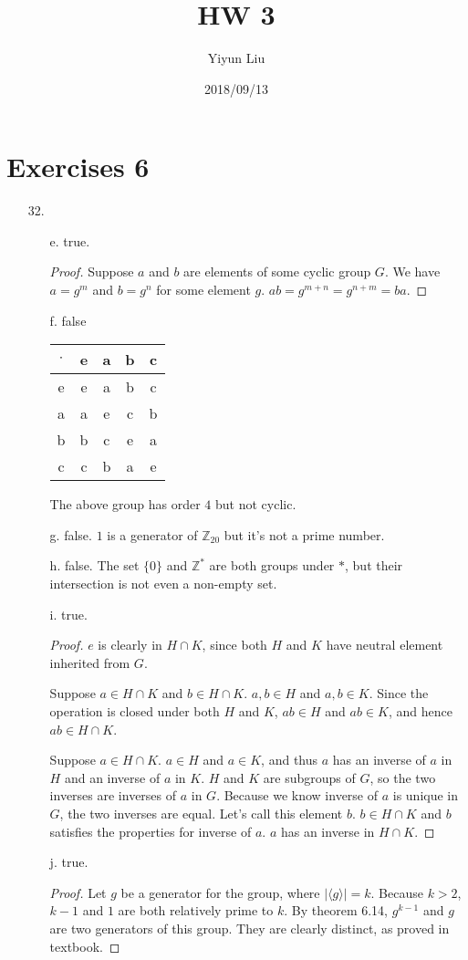 \documentclass{article}
\title{HW 3}
\date{2018/09/13}
\author{Yiyun Liu}
\begin{document}
\maketitle
\lstset{basicstyle=\ttfamily}

\section*{Exercises 6}
\begin{itemize}
\item [32.]
  \begin{itemize}
  \item [e.] true.
    \begin{proof}
      Suppose $a$ and $b$ are elements of some cyclic group $G$. We have $a=g^m$ and $b=g^n$ for some element $g$. $ab = g^{m+n} = g^{n+m}=ba$.
    \end{proof}
  \item [f.] false\\
    \begin{tabular}{c | c c c c }
      $\cdot$&e&a&b&c\\
      \hline
      e&e&a&b&c\\
      a&a&e&c&b\\
      b&b&c&e&a\\
      c&c&b&a&e
    \end{tabular}
    The above group has order $4$ but not cyclic. 
  \item [g.] false.
    $1$ is a generator of $\mathbb{Z}_{20}$ but it's not a prime number.
  \item [h.] false. The set $\{0\}$ and $\mathbb{Z}^*$ are both groups under $*$, but their intersection is not even a non-empty set.
  \item [i.] true.
    \begin{proof}
      $e$ is clearly in $H \cap K$, since both $H$ and $K$ have neutral element inherited from $G$.

      Suppose $a \in H \cap K$ and $b \in H \cap K$. $a,b\in H$ and $a,b \in K$. Since the operation is closed under both $H$ and $K$, $ab \in H$ and $ab \in K$, and hence $ab \in H \cap K$.

      Suppose $a \in H \cap K$. $a \in H$ and $a \in K$, and thus $a$ has an inverse of $a$ in $H$ and an inverse of $a$ in $K$. $H$ and $K$ are subgroups of $G$, so the two inverses are inverses of $a$ in $G$. Because we know inverse of $a$ is unique in $G$, the two inverses are equal. Let's call this element $b$. $b \in H \cap K$ and $b$ satisfies the properties for inverse of $a$. $a$ has an inverse in $H \cap K$.
    \end{proof}
  \item [j.] true.
    \begin{proof}
      Let $g$ be a generator for the group, where $|\langle g \rangle|=k$. Because $k>2$, $k-1$ and $1$ are both relatively prime to $k$. By theorem 6.14, $g^{k-1}$ and $g$ are two generators of this group. They are clearly distinct, as proved in textbook.
    \end{proof}
  \end{itemize}
\end{itemize}
\end{document}
